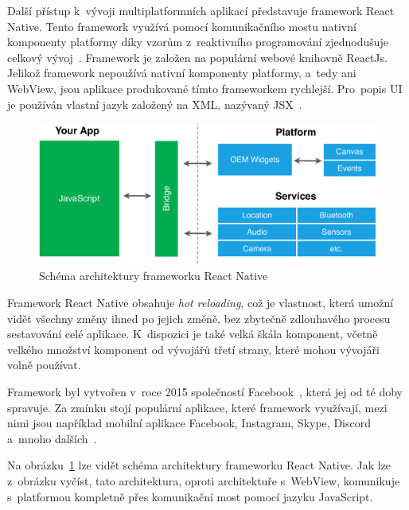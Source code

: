 Další přístup k~vývoji multiplatformních aplikací představuje framework
\linebreak React Native.
Tento framework využívá pomocí komunikačního mostu nativní komponenty platformy
díky vzorům z~reaktivního programování zjednodušuje celkový
vývoj~\cite{hackernoon_flutter}.
Framework je založen na populární webové
knihovně \mbox{ReactJs}.
Jelikož framework nepoužívá nativní komponenty platformy,
a~tedy ani WebView,
jsou aplikace produkované tímto frameworkem
rychlejší.\linebreak
Pro~popis UI je používán vlastní jazyk založený na XML,
nazývaný JSX~\cite{dashmagazine_mobile_frameworks}.

\begin{figure}
    \centering
    \includegraphics[width=\linewidth]{assets/technology-research/framework/react_native.pdf}
    \caption{Schéma architektury frameworku React Native~\cite{hackernoon_flutter}}
    \label{fig:framework_react_native}
\end{figure}

Framework React Native obsahuje \emph{hot reloading},
což je vlastnost,
která umožní vidět všechny změny ihned po jejich změně,
bez zbytečně zdlouhavého procesu sestavování celé aplikace.
K~dispozici je také velká škála komponent,
včetně velkého množství komponent od vývojářů třetí strany, 
které mohou vývojáři volně používat.~\cite{dashmagazine_mobile_frameworks}

Framework byl vytvořen v~roce 2015
společností Facebook~\cite{hackernoon_flutter},
která jej od té doby spravuje.
Za zmínku stojí populární aplikace,
které framework využívají,
mezi nimi jsou například mobilní aplikace Facebook, Instagram, Skype, Discord
a~mnoho dalších~\cite{react_native}.

Na obrázku~\ref{fig:framework_react_native} lze vidět schéma architektury
frameworku React Native.
Jak lze z~obrázku vyčíst,
tato architektura,
oproti architektuře s~WebView,
komunikuje s~platformou kompletně přes komunikační most pomocí jazyku
JavaScript.

